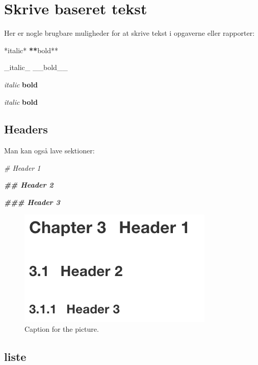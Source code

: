 \documentclass[
]{book}
\newenvironment{Shaded}{\begin{snugshade}}{\end{snugshade}}
\newcommand{\CommentTok}[1]{\textcolor[rgb]{0.56,0.35,0.01}{\textit{#1}}}
\newcommand{\DocumentationTok}[1]{\textcolor[rgb]{0.56,0.35,0.01}{\textbf{\textit{#1}}}}
\newcommand{\ErrorTok}[1]{\textcolor[rgb]{0.64,0.00,0.00}{\textbf{#1}}}
\newcommand{\NormalTok}[1]{#1}
\newcommand{\SpecialCharTok}[1]{\textcolor[rgb]{0.00,0.00,0.00}{#1}}
\begin{document}
\hypertarget{skrive-baseret-tekst}{%
\section{Skrive baseret tekst}\label{skrive-baseret-tekst}}

Her er nogle brugbare muligheder for at skrive tekst i opgaverne eller rapporter:

\begin{Shaded}
\begin{Highlighting}[]
\SpecialCharTok{*}\NormalTok{italic}\SpecialCharTok{*}   \ErrorTok{**}\NormalTok{bold}\SpecialCharTok{**}

\NormalTok{\_italic\_   \_\_bold\_\_}
\end{Highlighting}
\end{Shaded}

\emph{italic} \textbf{bold}

\emph{italic} \textbf{bold}

\hypertarget{headers}{%
\subsection{Headers}\label{headers}}

Man kan også lave sektioner:

\begin{Shaded}
\begin{Highlighting}[]
\CommentTok{\# Header 1}

\DocumentationTok{\#\# Header 2}

\DocumentationTok{\#\#\# Header 3}
\end{Highlighting}
\end{Shaded}

\begin{figure}
\centering
\includegraphics{header_eksempel.png}
\caption{Caption for the picture.}
\end{figure}

\hypertarget{liste}{%
\subsection{liste}\label{liste}}
\end{document}
